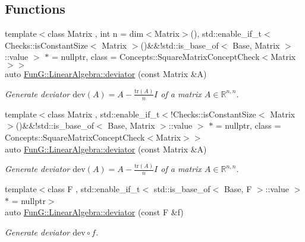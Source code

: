 \subsection*{Functions}
\begin{DoxyCompactItemize}
\item 
{\footnotesize template$<$class Matrix , int n = dim$<$\+Matrix$>$(), std\+::enable\+\_\+if\+\_\+t$<$ Checks\+::is\+Constant\+Size$<$ Matrix $>$()\&\&!std\+::is\+\_\+base\+\_\+of$<$ Base, Matrix $>$\+::value $>$ $\ast$  = nullptr, class  = Concepts\+::\+Square\+Matrix\+Concept\+Check$<$\+Matrix$>$$>$ }\\auto \hyperlink{group__LinearAlgebraGroup_ga7c0b1db93cfc5779a3b1e7eb1646c213}{Fun\+G\+::\+Linear\+Algebra\+::deviator} (const Matrix \&A)
\begin{DoxyCompactList}\small\item\em Generate deviator $ \mathrm{dev}(A) = A - \frac{\mathrm{tr}(A)}{n}I $ of a matrix $ A\in\mathbb{R}^{n,n} $. \end{DoxyCompactList}\item 
{\footnotesize template$<$class Matrix , std\+::enable\+\_\+if\+\_\+t$<$!\+Checks\+::is\+Constant\+Size$<$ Matrix $>$()\&\&!std\+::is\+\_\+base\+\_\+of$<$ Base, Matrix $>$\+::value $>$ $\ast$  = nullptr, class  = Concepts\+::\+Square\+Matrix\+Concept\+Check$<$\+Matrix$>$$>$ }\\auto \hyperlink{group__LinearAlgebraGroup_gabc90de0d1754cd2e2d190ea8ba62245f}{Fun\+G\+::\+Linear\+Algebra\+::deviator} (const Matrix \&A)
\begin{DoxyCompactList}\small\item\em Generate deviator $ \mathrm{dev}(A) = A - \frac{\mathrm{tr}(A)}{n}I $ of a matrix $ A\in\mathbb{R}^{n,n} $. \end{DoxyCompactList}\item 
{\footnotesize template$<$class F , std\+::enable\+\_\+if\+\_\+t$<$ std\+::is\+\_\+base\+\_\+of$<$ Base, F $>$\+::value $>$ $\ast$  = nullptr$>$ }\\auto \hyperlink{group__LinearAlgebraGroup_gad363f3add577abc046fc525ce83e22d3}{Fun\+G\+::\+Linear\+Algebra\+::deviator} (const F \&f)
\begin{DoxyCompactList}\small\item\em Generate deviator $ \mathrm{dev}\circ f$. \end{DoxyCompactList}\end{DoxyCompactItemize}
